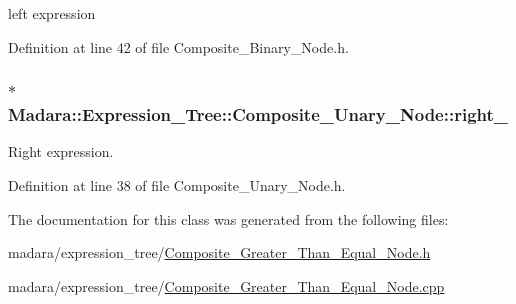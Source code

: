 left expression 



Definition at line 42 of file Composite\_\-Binary\_\-Node.h.

\hypertarget{classMadara_1_1Expression__Tree_1_1Composite__Unary__Node_a077b7bd1b52df6f5c6adfde735556a68}{
\subsubsection[{right\_\-}]{$\ast$ {\bf Madara::Expression\_\-Tree::Composite\_\-Unary\_\-Node::right\_\-}}}
\label{d3/dc7/classMadara_1_1Expression__Tree_1_1Composite__Unary__Node_a077b7bd1b52df6f5c6adfde735556a68}


Right expression. 



Definition at line 38 of file Composite\_\-Unary\_\-Node.h.



The documentation for this class was generated from the following files:\begin{DoxyCompactItemize}
\item 
madara/expression\_\-tree/\hyperlink{Composite__Greater__Than__Equal__Node_8h}{Composite\_\-Greater\_\-Than\_\-Equal\_\-Node.h}\item 
madara/expression\_\-tree/\hyperlink{Composite__Greater__Than__Equal__Node_8cpp}{Composite\_\-Greater\_\-Than\_\-Equal\_\-Node.cpp}\end{DoxyCompactItemize}
